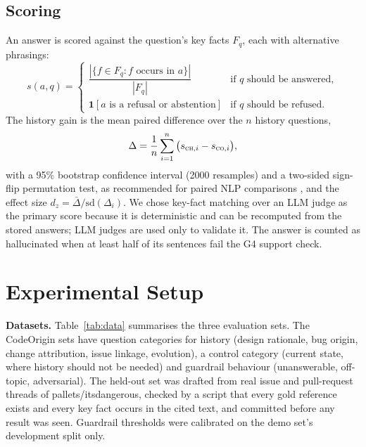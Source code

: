 \documentclass[12pt,onecolumn,draftclsnofoot]{IEEEtran}
\begin{document}
\subsection{Scoring}
An answer is scored against the question's key facts $F_q$, each with alternative phrasings:
\begin{equation}
s(a,q)=\begin{cases}\dfrac{|\{f\in F_q : f \text{ occurs in } a\}|}{|F_q|} & \text{if } q \text{ should be answered},\\[6pt] \mathbf{1}[a \text{ is a refusal or abstention}] & \text{if } q \text{ should be refused.}\end{cases}
\label{eq:score}
\end{equation}
The history gain is the mean paired difference over the $n$ history questions,
\begin{equation}
\Delta=\frac{1}{n}\sum_{i=1}^{n}\big(s_{\textsc{ch},i}-s_{\textsc{co},i}\big),
\label{eq:delta}
\end{equation}
with a 95\% bootstrap confidence interval (2000 resamples) and a two-sided sign-flip permutation test, as recommended for paired NLP comparisons \cite{dror2018significance}, and the effect size $d_z=\bar{\Delta}/\mathrm{sd}(\Delta_i)$. We chose key-fact matching over an LLM judge as the primary score because it is deterministic and can be recomputed from the stored answers; LLM judges are used only to validate it. The answer is counted as hallucinated when at least half of its sentences fail the G4 support check.

\section{Experimental Setup}

\textbf{Datasets.} Table~\ref{tab:data} summarises the three evaluation sets. The CodeOrigin sets have question categories for history (design rationale, bug origin, change attribution, issue linkage, evolution), a control category (current state, where history should not be needed) and guardrail behaviour (unanswerable, off-topic, adversarial). The held-out set was drafted from real issue and pull-request threads of pallets/itsdangerous, checked by a script that every gold reference exists and every key fact occurs in the cited text, and committed before any result was seen. Guardrail thresholds were calibrated on the demo set's development split only.
\end{document}
